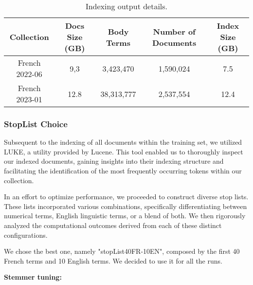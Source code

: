 \begin{table}[h]
    \centering
    \begin{tabular}{|c|c|c|c|c|}
        \hline
        Collection & Docs Size (GB) & Body Terms & Number of Documents & Index Size (GB) \\
        \hline
        French 2022-06 & 9,3 & 3,423,470 & 1,590,024 & 7.5 \\
        \hline
        French 2023-01 & 12.8 & 38,313,777 & 2,537,554 & 12.4 \\
        \hline
    \end{tabular}
    \caption{Indexing output details.}
    \label{tab:Indexing_details}
\end{table}

\subsubsection{StopList Choice}
Subsequent to the indexing of all documents within the training set, we utilized LUKE, a utility provided by Lucene. This tool enabled us to thoroughly inspect our indexed documents, gaining insights into their indexing structure and facilitating the identification of the most frequently occurring tokens within our collection.

In an effort to optimize performance, we proceeded to construct diverse stop lists. These lists incorporated various combinations, specifically differentiating between numerical terms, English linguistic terms, or a blend of both. We then rigorously analyzed the computational outcomes derived from each of these distinct configurations.

We chose the best one, namely "stopList40FR-10EN", composed by the first 40 French terms and 10 English terms. We decided to use it for all the runs.

\textbf{Stemmer tuning:}

